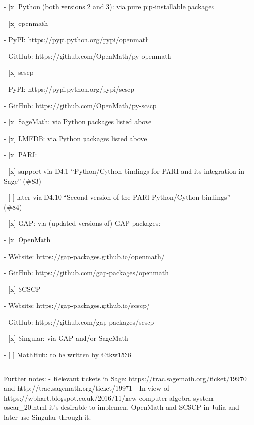 - {[}x{]} Python (both versions 2 and 3): via pure
pip-installable packages 

- {[}x{]} openmath 

- PyPI: https://pypi.python.org/pypi/openmath 

- GitHub: https://github.com/OpenMath/py-openmath 

- {[}x{]} scscp 

- PyPI: https://pypi.python.org/pypi/scscp 

- GitHub: https://github.com/OpenMath/py-scscp 

- {[}x{]} SageMath: via Python
packages listed above 

- {[}x{]} LMFDB: via Python packages listed above

- {[}x{]} PARI: 

- {[}x{]} support via D4.1 ``Python/Cython bindings for
PARI and its integration in Sage'' (\#83) 

- {[} {]} later via D4.10
``Second version of the PARI Python/Cython bindings'' (\#84) 

- {[}x{]}
GAP: via (updated versions of) GAP packages: 

- {[}x{]} OpenMath 

- Website: https://gap-packages.github.io/openmath/ 

- GitHub: https://github.com/gap-packages/openmath 

- {[}x{]} SCSCP 

- Website: https://gap-packages.github.io/scscp/ 

- GitHub: https://github.com/gap-packages/scscp 

- {[}x{]} Singular: via GAP and/or SageMath 

- {[} {]} MathHub: to be written by @tkw1536

\begin{center}\rule{0.5\linewidth}{\linethickness}\end{center}

Further notes: - Relevant tickets in Sage:
https://trac.sagemath.org/ticket/19970 and
http://trac.sagemath.org/ticket/19971 - In view of
https://wbhart.blogspot.co.uk/2016/11/new-computer-algebra-system-oscar\_20.html
it's desirable to implement OpenMath and SCSCP in Julia and later use
Singular through it.
